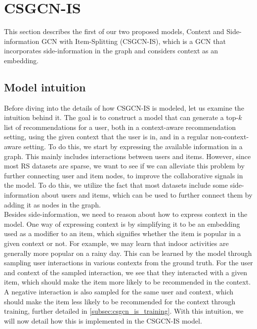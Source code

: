 \section{CSGCN-IS}\label{sec:csgcn_is}
This section describes the first of our two proposed models, Context and Side-information GCN with Item-Splitting (CSGCN-IS), which is a GCN that incorporates side-information in the graph and considers context as an embedding.

\subsection{Model intuition}\label{subsec:csgcn_is_intuition}
Before diving into the details of how CSGCN-IS is modeled, let us examine the intuition behind it.
The goal is to construct a model that can generate a top-$k$ list of recommendations for a user, both in a context-aware recommendation setting, using the given context that the user is in, and in a regular non-context-aware setting.
To do this, we start by expressing the available information in a graph.
This mainly includes interactions between users and items.
However, since most RS datasets are sparse, we want to see if we can alleviate this problem by further connecting user and item nodes, to improve the collaborative signals in the model.
To do this, we utilize the fact that most datasets include some side-information about users and items, which can be used to further connect them by adding it as nodes in the graph.\\
Besides side-information, we need to reason about how to express context in the model.
One way of expressing context is by simplifying it to be an embedding used as a modifier to an item, which signifies whether the item is popular in a given context or not.
For example, we may learn that indoor activities are generally more popular on a rainy day.
This can be learned by the model through sampling user interactions in various contexts from the ground truth.
For the user and context of the sampled interaction, we see that they interacted with a given item, which should make the item more likely to be recommended in the context.
A negative interaction is also sampled for the same user and context, which should make the item less likely to be recommended for the context through training, further detailed in \autoref{subsec:csgcn_is_training}.
With this intuition, we will now detail how this is implemented in the CSGCN-IS model.

